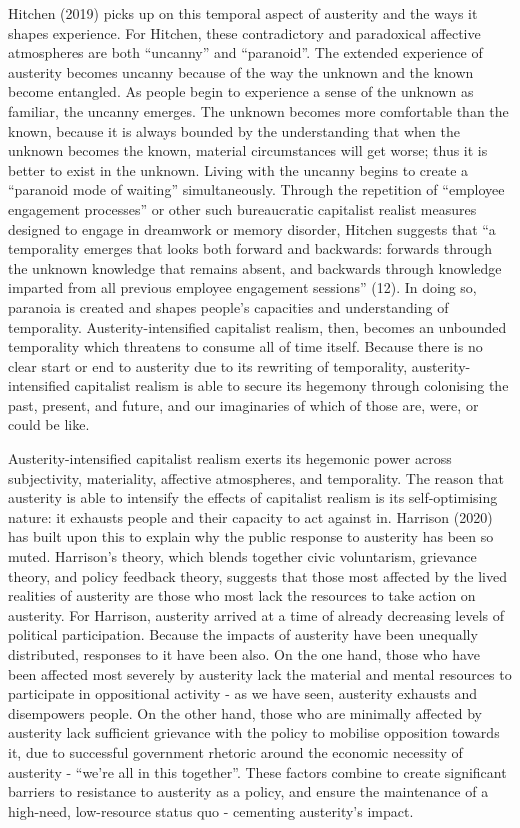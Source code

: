 Hitchen (2019) picks up on this temporal aspect of austerity and the
ways it shapes experience. For Hitchen, these contradictory and
paradoxical affective atmospheres are both ``uncanny'' and ``paranoid''.
The extended experience of austerity becomes uncanny because of the way
the unknown and the known become entangled. As people begin to
experience a sense of the unknown as familiar, the uncanny emerges. The
unknown becomes more comfortable than the known, because it is always
bounded by the understanding that when the unknown becomes the known,
material circumstances will get worse; thus it is better to exist in the
unknown. Living with the uncanny begins to create a ``paranoid mode of
waiting'' simultaneously. Through the repetition of ``employee
engagement processes'' or other such bureaucratic capitalist realist
measures designed to engage in dreamwork or memory disorder, Hitchen
suggests that ``a temporality emerges that looks both forward and
backwards: forwards through the unknown knowledge that remains absent,
and backwards through knowledge imparted from all previous employee
engagement sessions'' (12). In doing so, paranoia is created and shapes
people's capacities and understanding of temporality.
Austerity-intensified capitalist realism, then, becomes an unbounded
temporality which threatens to consume all of time itself. Because there
is no clear start or end to austerity due to its rewriting of
temporality, austerity-intensified capitalist realism is able to secure
its hegemony through colonising the past, present, and future, and our
imaginaries of which of those are, were, or could be like.

Austerity-intensified capitalist realism exerts its hegemonic power
across subjectivity, materiality, affective atmospheres, and
temporality. The reason that austerity is able to intensify the effects
of capitalist realism is its self-optimising nature: it exhausts people
and their capacity to act against in. Harrison (2020) has built upon
this to explain why the public response to austerity has been so muted.
Harrison's theory, which blends together civic voluntarism, grievance
theory, and policy feedback theory, suggests that those most affected by
the lived realities of austerity are those who most lack the resources
to take action on austerity. For Harrison, austerity arrived at a time
of already decreasing levels of political participation. Because the
impacts of austerity have been unequally distributed, responses to it
have been also. On the one hand, those who have been affected most
severely by austerity lack the material and mental resources to
participate in oppositional activity - as we have seen, austerity
exhausts and disempowers people. On the other hand, those who are
minimally affected by austerity lack sufficient grievance with the
policy to mobilise opposition towards it, due to successful government
rhetoric around the economic necessity of austerity - ``we're all in
this together''. These factors combine to create significant barriers to
resistance to austerity as a policy, and ensure the maintenance of a
high-need, low-resource status quo - cementing austerity's impact.

